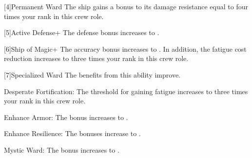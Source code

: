     [4]{Permanent Ward} The ship gains a bonus to its damage resistance equal to four times your rank in this crew role.

    [5]{Active Defense+} The defense bonus increases to .

    [6]{Ship of Magic+} The accuracy bonus increases to .
      In addition, the fatigue cost reduction increases to three times your rank in this crew role.

    [7]{Specialized Ward} The benefits from this ability improve.
      \begin{raggeditemize}
        \item Desperate Fortification: The threshold for gaining fatigue increases to three times your rank in this crew role.
        \item Enhance Armor: The bonus increases to .
        \item Enhance Resilience: The bonuses increase to .
        \item Mystic Ward: The bonus increases to .
      \end{raggeditemize}
